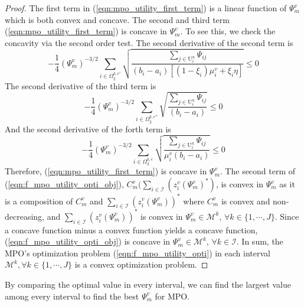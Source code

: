 \documentclass[conference]{IEEEtran}
\begin{document}
\begin{proof}
The first term in (\ref{eqn:mpo_utility_first_term}) is a linear function of $\Psi_m^v$ which is both convex and concave. The second and third term (\ref{eqn:mpo_utility_first_term}) is concave in $\Psi_m^v$. To see this, we check the concavity via the second order test. The second derivative of the second term is
\begin{equation}
-\frac{1}{4}(\Psi_m^v)^{-3/2}\sum_{i \in \Omega_2^{k,e'}} \sqrt{\frac{\sum_{j \in \mathrm{U}_i^n}\Psi_{ij}}{(b_i-a_i)[(1-\xi_i)\mu_i^v + \xi_i \eta]}} \leq 0
\end{equation}
The second derivative of the third term is
\begin{equation}
-\frac{1}{4}(\Psi_m^v)^{-3/2}\sum_{i \in \Omega_2^{k,e''}} \sqrt{\frac{\sum_{j \in \mathrm{U}_i^n}\Psi_{ij}}{(b_i-a_i)}} \leq 0
\end{equation}
And the second derivative of the forth term is
\begin{equation}
-\frac{1}{4}(\Psi_m^v)^{-3/2}\sum_{i \in \Omega_3^{k,e}} \sqrt{\frac{\sum_{j \in \mathrm{U}_i^n}\Psi_{ij}}{\mu_i^v(b_i-a_i)}} \leq 0
\end{equation}
Therefore, (\ref{eqn:mpo_utility_first_term}) is concave in $\Psi_m^v$. The second term of (\ref{eqn:f_mpo_utility_opti_obj}), $C_m^v\big(\sum_{i \in \mathcal{I}} (z_{i}^v(\Psi_m^v)^*)$, is convex in $\Psi_m^v$ as it is a composition of $C_m^v$ and $\sum_{i \in \mathcal{I}} (z_{i}^v(\Psi_m^v))^*$ where $C_m^v$ is convex and non-decreasing, and $\sum_{i \in \mathcal{I}} (z_{i}^v(\Psi_m^v))^*$ is convex in $\Psi_m^v \in \mathcal{M}^k,\, \forall k \in \{1, \cdots, J\}$. Since a concave function minus a convex function yields a concave function, (\ref{eqn:f_mpo_utility_opti_obj}) is concave in $\Psi_m^v \in \mathcal{M}^k,\, \forall k \in \mathcal{I}$. In sum, the MPO's optimization problem (\ref{eqn:f_mpo_utility_opti}) in each interval $\mathcal{M}^k, \forall k \in \{1, \cdots, J\}$ is a convex optimization problem. \qedhere
\end{proof}
By comparing the optimal value in every interval, we can find the largest value among every interval to find the best $\Psi_m^v$ for MPO.
\end{document}
